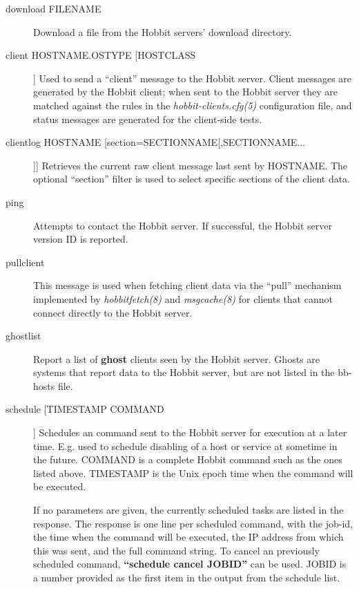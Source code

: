 \begin{description}
 

\item[download FILENAME] Download a file from the Hobbit servers' download directory. 

 

\item[client HOSTNAME.OSTYPE [HOSTCLASS]] Used to send a ``client''
  message to the Hobbit server. Client messages are generated by the
  Hobbit client; when sent to the Hobbit server they are matched
  against the rules in the \emph{hobbit-clients.cfg(5)} configuration
  file, and status messages are generated for the client-side tests. 


 

\item[clientlog HOSTNAME [section=SECTIONNAME[,SECTIONNAME...]]]
  Retrieves the current raw client message last sent by HOSTNAME. The
  optional ``section'' filter is used to select specific sections of
  the client data. 



\item[ping] Attempts to contact the Hobbit server. If successful, the Hobbit server version ID is reported. 

 

\item[pullclient] This message is used when fetching client data via
  the ``pull'' mechanism implemented by \emph{hobbitfetch(8)} and
  \emph{msgcache(8)} for clients that cannot connect directly to the
  Hobbit server. 


 

\item[ghostlist] Report a list of \textbf{ghost} clients seen by the
  Hobbit server. Ghosts are systems that report data to the Hobbit
  server, but are not listed in the bb-hosts file. 


 

\item[schedule [TIMESTAMP COMMAND]] Schedules an command sent to the
  Hobbit server for execution at a later time. E.g. used to schedule
  disabling of a host or service at sometime in the future. COMMAND is
  a complete Hobbit command such as the ones listed above. TIMESTAMP
  is the Unix epoch time when the command will be executed.  

 If no parameters are given, the currently scheduled tasks are listed
 in the response. The response is one line per scheduled command, with
 the job-id, the time when the command will be executed, the IP
 address from which this was sent, and the full command string.   To
 cancel an previously scheduled command, \textbf{``schedule cancel
 JOBID''} can be used. JOBID is a number provided as the first item in
 the output from the schedule list. 


 


\end{description}

